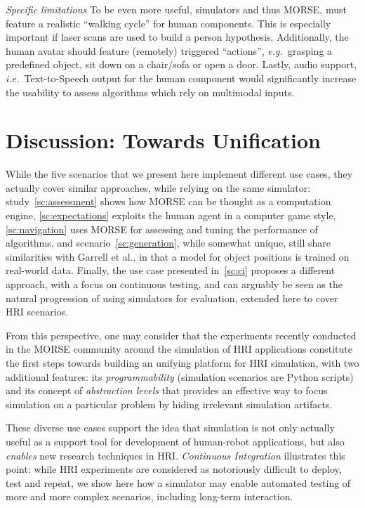 \documentclass{llncs}
\newcommand{\eg}{{\textit{e.g.~}}}
\newcommand{\ie}{{\textit{i.e.~}}}
\begin{document}
\emph{Specific limitations} To be even more useful, simulators and thus MORSE, must
feature a realistic ``walking cycle'' for human components. This is especially
important if laser scans are used to build a person hypothesis. Additionally, the
human avatar should feature (remotely) triggered ``actions'', \eg grasping a 
predefined object, sit down on a chair/sofa or open a door. Lastly, audio support, 
\ie Text-to-Speech output for the human component would significantly increase
the usability to assess algorithms which rely on multimodal inputs. 

\section{Discussion: Towards Unification}

While the five scenarios that we present here implement different use cases,
they actually cover similar approaches, while relying on the same simulator:
study~\ref{sc:assessment} shows how MORSE can be thought as a computation
engine, \ref{sc:expectations} exploits the human agent in a computer game style,
\ref{sc:navigation} uses MORSE for assessing and tuning the performance of
algorithms, and scenario~\ref{sc:generation}, while somewhat unique, still share
similarities with Garrell et al., in that a model for object positions is
trained on real-world data. Finally, the use case presented in~\ref{sc:ci}
proposes a different approach, with a focus on continuous testing, and can
arguably be seen as the natural progression of using simulators for evaluation,
extended here to cover HRI scenarios.

From this perspective, one may consider that the experiments recently conducted
in the MORSE community around the simulation of HRI applications constitute the
first steps towards building an unifying platform for HRI simulation, with two
additional features: its \emph{programmability} (simulation scenarios are Python
scripts) and its concept of \emph{abstraction levels} that provides an effective
way to focus simulation on a particular problem by hiding irrelevant simulation
artifacts.

These diverse use cases support the idea that simulation is not only actually
useful as a support tool for development of human-robot applications, but also
\emph{enables} new research techniques in HRI. \emph{Continuous Integration}
illustrates this point: while HRI experiments are considered as notoriously
difficult to deploy, test and repeat, we show here how a simulator may enable
automated testing of more and more complex scenarios, including long-term
interaction.
\end{document}
